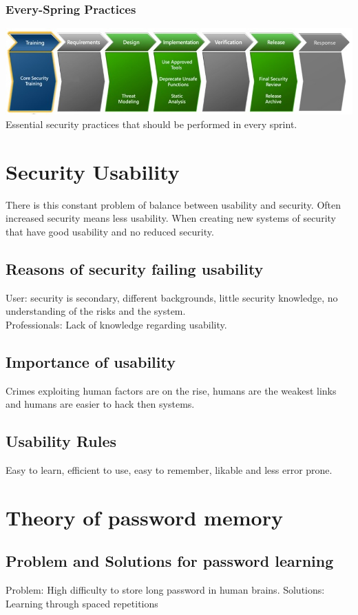 \documentclass[10pt,a4paper,final]{report}
\begin{document}
\subsubsection{Every-Spring Practices}
\includegraphics[scale=.53]{sprint.jpg}\\
Essential security practices that should be  performed in every sprint.
\section{Security Usability}
There is this constant problem of balance between usability and security.
Often increased security means less usability. When creating new systems of security that have good usability and no reduced security.
\subsection{Reasons of security failing usability}
User: security is secondary, different backgrounds, little security knowledge, no understanding of the risks and the system.\\
Professionals: Lack of knowledge regarding usability.
\subsection{Importance of usability}
Crimes exploiting human factors are on the rise, humans are the weakest links and humans are easier to hack then systems.
\subsection{Usability Rules}
Easy to learn, efficient to use, easy to remember, likable and less error prone.
\section{Theory of password memory}
\subsection{Problem and Solutions for password learning}
Problem: High difficulty to store long password in human brains.
Solutions: Learning through spaced repetitions
\end{document}
